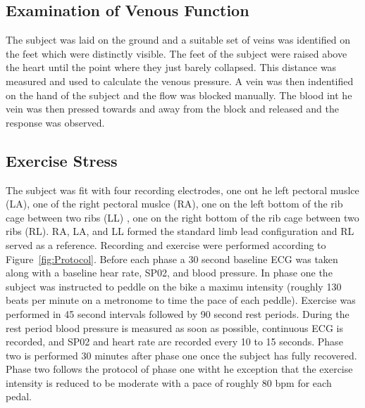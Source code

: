 \documentclass[12pt]{article}
\begin{document}
\subsection{Examination of Venous Function}
The subject was laid on the ground and a suitable set of veins was identified on the feet which were distinctly visible. The feet of the subject were raised above the heart until the point where they just barely collapsed. This distance was measured and used to calculate the venous pressure. A vein was then indentified on the hand of the subject and the flow was blocked manually.  The blood int he vein was then pressed towards and away from the block and released and the response was observed.

\subsection{Exercise Stress}
The subject was fit with four recording electrodes, one ont he left pectoral muslce (LA), one of the right pectoral muslce (RA), one on the left bottom of the rib cage between two ribs (LL) , one on the right bottom of the rib cage between two ribs (RL). RA, LA, and LL formed the standard limb lead configuration and RL served as a reference. Recording and exercise were performed according to Figure~\ref{fig:Protocol}. Before each phase a 30 second baseline ECG was taken along with a baseline hear rate, SP02, and blood pressure. In phase one the subject was instructed to peddle on the bike a maximu intensity (roughly 130 beats per minute on a metronome to time the pace of each peddle). Exercise was performed in 45 second intervals followed by 90 second rest periods. During the rest period blood pressure is measured as soon as possible, continuous ECG is recorded, and SP02 and heart rate are recorded every 10 to 15 seconds. Phase two is performed 30 minutes after phase one once the subject has fully recovered. Phase two follows the protocol of phase one witht he exception that the exercise intensity is reduced to be moderate with a pace of roughly 80 bpm for each pedal.
\end{document}
